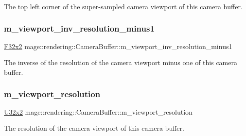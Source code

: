 The top left corner of the super-\/sampled camera viewport of this camera buffer. \hypertarget{structmage_1_1rendering_1_1_camera_buffer_a87dae6d19b7c84d361ff5304cc0fd637}{}\label{structmage_1_1rendering_1_1_camera_buffer_a87dae6d19b7c84d361ff5304cc0fd637} 
\subsubsection{\texorpdfstring{m\+\_\+viewport\+\_\+inv\+\_\+resolution\+\_\+minus1}{m\_viewport\_inv\_resolution\_minus1}}
{\footnotesize\ttfamily \hyperlink{namespacemage_aa87237ad091f5cd7da612b8523fc108f}{F32x2} mage\+::rendering\+::\+Camera\+Buffer\+::m\+\_\+viewport\+\_\+inv\+\_\+resolution\+\_\+minus1}

The inverse of the resolution of the camera viewport minus one of this camera buffer. \hypertarget{structmage_1_1rendering_1_1_camera_buffer_a433bdb3d8b4e86fcd04fdb2b794bd0f7}{}\label{structmage_1_1rendering_1_1_camera_buffer_a433bdb3d8b4e86fcd04fdb2b794bd0f7} 
\subsubsection{\texorpdfstring{m\+\_\+viewport\+\_\+resolution}{m\_viewport\_resolution}}
{\footnotesize\ttfamily \hyperlink{namespacemage_a88e05bff0300120c013285d3dcad95c5}{U32x2} mage\+::rendering\+::\+Camera\+Buffer\+::m\+\_\+viewport\+\_\+resolution}

The resolution of the camera viewport of this camera buffer. \hypertarget{structmage_1_1rendering_1_1_camera_buffer_a6b0e644fb4e7dfd2f55ac4f447cddfac}{}\label{structmage_1_1rendering_1_1_camera_buffer_a6b0e644fb4e7dfd2f55ac4f447cddfac} 
